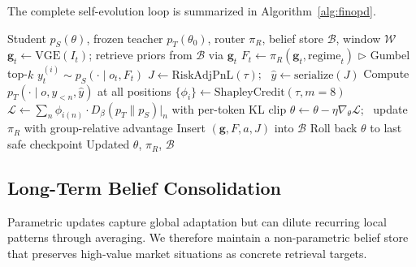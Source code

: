 The complete self-evolution loop is summarized in Algorithm~\ref{alg:finopd}.

\begin{algorithm}[t]
\caption{\textsc{FinOPD} Self-Evolution (One Iteration)}
\label{alg:finopd}
\begin{algorithmic}[1]
\REQUIRE Student $p_S(\theta)$, frozen teacher $p_T(\theta_0)$, router $\pi_R$, belief store $\mathcal{B}$, window $\mathcal{W}$
\STATE $\mathbf{g}_t \leftarrow \mathrm{VGE}(I_t)$; retrieve priors from $\mathcal{B}$ via $\mathbf{g}_t$
\STATE $F_t \leftarrow \pi_R(\mathbf{g}_t, \mathrm{regime}_t)$ \hfill $\triangleright$ Gumbel top-$k$
\STATE $y^{(i)}_t \sim p_S(\cdot \mid o_t, F_t)$
\ENDFOR
\ENDFOR
\STATE $J \leftarrow \mathrm{RiskAdjPnL}(\tau)$; \ $\hat{y} \leftarrow \mathrm{serialize}(J)$
\STATE Compute $p_T(\cdot \mid o, y_{<n}, \hat{y})$ at all positions
\STATE $\{\phi_i\} \leftarrow \mathrm{ShapleyCredit}(\tau, m{=}8)$
\STATE $\mathcal{L} \leftarrow \sum_n \phi_{i(n)} \cdot D_\beta(p_T \| p_S)|_n$ with per-token KL clip
\STATE $\theta \leftarrow \theta - \eta \nabla_\theta \mathcal{L}$; \ update $\pi_R$ with group-relative advantage
\STATE Insert $(\mathbf{g}, F, a, J)$ into $\mathcal{B}$
\ENDIF
{}
\STATE Roll back $\theta$ to last safe checkpoint
\ENDIF
\RETURN Updated $\theta$, $\pi_R$, $\mathcal{B}$
\end{algorithmic}
\end{algorithm}

\subsection{Long-Term Belief Consolidation}
\label{sec:belief}

Parametric updates capture global adaptation but can dilute recurring local patterns through averaging. We therefore maintain a non-parametric belief store that preserves high-value market situations as concrete retrieval targets.

